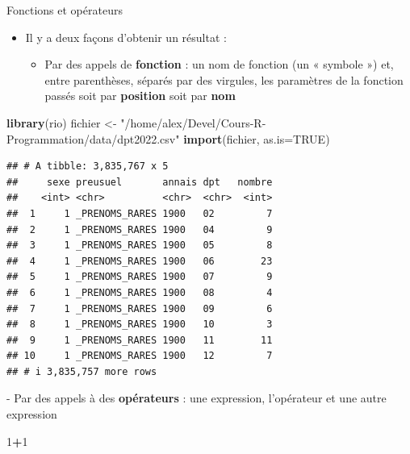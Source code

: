 \documentclass[
  ignorenonframetext,
]{beamer}
\newenvironment{Shaded}{\begin{snugshade}}{\end{snugshade}}
\newcommand{\AttributeTok}[1]{\textcolor[rgb]{0.13,0.29,0.53}{#1}}
\newcommand{\ConstantTok}[1]{\textcolor[rgb]{0.56,0.35,0.01}{#1}}
\newcommand{\DecValTok}[1]{\textcolor[rgb]{0.00,0.00,0.81}{#1}}
\newcommand{\FunctionTok}[1]{\textcolor[rgb]{0.13,0.29,0.53}{\textbf{#1}}}
\newcommand{\NormalTok}[1]{#1}
\newcommand{\OtherTok}[1]{\textcolor[rgb]{0.56,0.35,0.01}{#1}}
\newcommand{\SpecialCharTok}[1]{\textcolor[rgb]{0.81,0.36,0.00}{\textbf{#1}}}
\newcommand{\StringTok}[1]{\textcolor[rgb]{0.31,0.60,0.02}{#1}}
\providecommand{\tightlist}{%
  \setlength{\itemsep}{0pt}\setlength{\parskip}{0pt}}
\begin{document}
\begin{frame}[fragile]{Fonctions et opérateurs}
\protect\hypertarget{fonctions-et-opuxe9rateurs}{}
\begin{itemize}
\tightlist
\item
  Il y a deux façons d'obtenir un résultat :

  \begin{itemize}
  \tightlist
  \item
    Par des appels de \textbf{fonction} : un nom de fonction (un «
    symbole ») et, entre parenthèses, séparés par des virgules, les
    paramètres de la fonction passés soit par \textbf{position} soit par
    \textbf{nom}
  \end{itemize}
\end{itemize}

\tiny

\begin{Shaded}
\begin{Highlighting}[]
\FunctionTok{library}\NormalTok{(rio)}
\NormalTok{fichier }\OtherTok{\textless{}{-}} \StringTok{"/home/alex/Devel/Cours{-}R{-}Programmation/data/dpt2022.csv"}
\FunctionTok{import}\NormalTok{(fichier, }\AttributeTok{as.is=}\ConstantTok{TRUE}\NormalTok{)}
\end{Highlighting}
\end{Shaded}

\begin{verbatim}
## # A tibble: 3,835,767 x 5
##     sexe preusuel       annais dpt   nombre
##    <int> <chr>          <chr>  <chr>  <int>
##  1     1 _PRENOMS_RARES 1900   02         7
##  2     1 _PRENOMS_RARES 1900   04         9
##  3     1 _PRENOMS_RARES 1900   05         8
##  4     1 _PRENOMS_RARES 1900   06        23
##  5     1 _PRENOMS_RARES 1900   07         9
##  6     1 _PRENOMS_RARES 1900   08         4
##  7     1 _PRENOMS_RARES 1900   09         6
##  8     1 _PRENOMS_RARES 1900   10         3
##  9     1 _PRENOMS_RARES 1900   11        11
## 10     1 _PRENOMS_RARES 1900   12         7
## # i 3,835,757 more rows
\end{verbatim}

\normalsize - Par des appels à des \textbf{opérateurs} : une expression,
l'opérateur et une autre expression

\tiny

\begin{Shaded}
\begin{Highlighting}[]
\DecValTok{1}\SpecialCharTok{+}\DecValTok{1}
\end{Highlighting}
\end{Shaded}


\end{frame}
\end{document}
